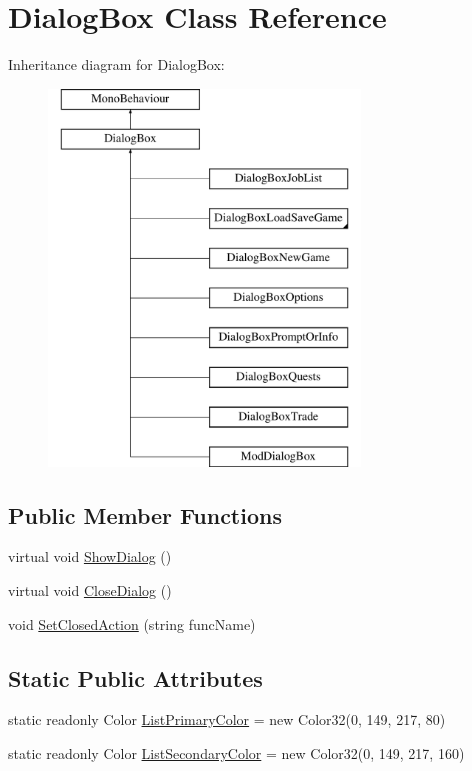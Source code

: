 \hypertarget{class_dialog_box}{}\section{Dialog\+Box Class Reference}
\label{class_dialog_box}
Inheritance diagram for Dialog\+Box\+:\begin{figure}[H]
\begin{center}
\leavevmode
\includegraphics[height=10.000000cm]{class_dialog_box}
\end{center}
\end{figure}
\subsection*{Public Member Functions}
\begin{DoxyCompactItemize}
\item 
virtual void \hyperlink{class_dialog_box_a971a6e45f6ca26863c3910680521b0ac}{Show\+Dialog} ()
\item 
virtual void \hyperlink{class_dialog_box_ad4f408b78d5e109525c229ad34f5a447}{Close\+Dialog} ()
\item 
void \hyperlink{class_dialog_box_a730b66f1a8be9d26e4edc01d3f6bbbe0}{Set\+Closed\+Action} (string func\+Name)
\end{DoxyCompactItemize}
\subsection*{Static Public Attributes}
\begin{DoxyCompactItemize}
\item 
static readonly Color \hyperlink{class_dialog_box_a1e9c820a746c25aa4451f8d4c63f2178}{List\+Primary\+Color} = new Color32(0, 149, 217, 80)
\item 
static readonly Color \hyperlink{class_dialog_box_a8f3879eebe2ba0418c35504c04c1c7c6}{List\+Secondary\+Color} = new Color32(0, 149, 217, 160)
\end{DoxyCompactItemize}

